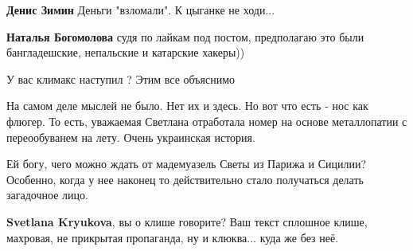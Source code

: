\begin{itemize}
 
\textbf{Денис Зимин}
Деньги "взломали".
К цыганке не ходи...
\Laughey[1.0][white]

 
\textbf{Наталья Богомолова} судя по лайкам под постом, предполагаю это были бангладешские, непальские и катарские хакеры))

 
У вас климакс наступил ? Этим все объяснимо

 

На самом деле мыслей не было. Нет их и здесь. Но вот что есть - нос как флюгер.
То есть, уважаемая Светлана отработала номер на основе металлопатии с
переообуванем на лету. Очень украинская история.

Ей богу, чего можно ждать от мадемуазель Светы из Парижа и Сицилии? Особенно,
когда у нее наконец то действительно стало получаться делать загадочное лицо.

 
\textbf{Svetlana Kryukova}, вы о клише говорите? Ваш текст сплошное клише,
махровая, не прикрытая пропаганда, ну и клюква... куда же без неё.

\end{itemize}

